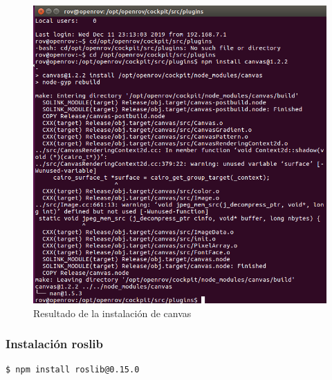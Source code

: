         \begin{figure}[H]
            \centering
            \includegraphics[scale=0.70]{partes/ImgSophia/ApendiceB/instalacionCanvasCompleta.png}
            \caption{Resultado de la instalación de canvas}
            \label{fig:InsCanvas}
        \end{figure}

\subsubsection{Instalación roslib}
\begin{verbatim}
$ npm install roslib@0.15.0    
\end{verbatim}

